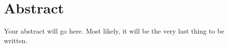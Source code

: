 \documentclass[\main/main.tex]{subfiles}
\begin{document}
\chapter*{Abstract}
Your abstract will go here. Most likely, it will be the very last thing to be written.
\end{document}
